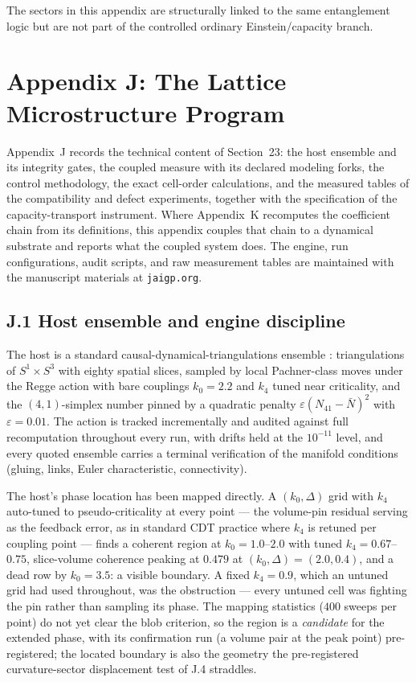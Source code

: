 \documentclass[11pt]{article}
\begin{document}
The sectors in this appendix are structurally linked to the same entanglement logic but are not part of the controlled ordinary Einstein/capacity branch.

\section*{Appendix J: The Lattice Microstructure Program}

Appendix~J records the technical content of Section~23: the host ensemble and its integrity gates, the coupled measure with its declared modeling forks, the control methodology, the exact cell-order calculations, and the measured tables of the compatibility and defect experiments, together with the specification of the capacity-transport instrument. Where Appendix~K recomputes the coefficient chain from its definitions, this appendix couples that chain to a dynamical substrate and reports what the coupled system does. The engine, run configurations, audit scripts, and raw measurement tables are maintained with the manuscript materials at \texttt{jaigp.org}.

\subsection*{J.1 Host ensemble and engine discipline}

The host is a standard causal-dynamical-triangulations ensemble \citep{AmbjornJurkiewiczLoll2004,AmbjornGJL2012}: triangulations of $S^1\times S^3$ with eighty spatial slices, sampled by local Pachner-class moves under the Regge action with bare couplings $k_0=2.2$ and $k_4$ tuned near criticality, and the $(4,1)$-simplex number pinned by a quadratic penalty $\varepsilon(N_{41}-\bar N)^2$ with $\varepsilon=0.01$. The action is tracked incrementally and audited against full recomputation throughout every run, with drifts held at the $10^{-11}$ level, and every quoted ensemble carries a terminal verification of the manifold conditions (gluing, links, Euler characteristic, connectivity).

The host's phase location has been mapped directly. A $(k_0,\Delta)$ grid with $k_4$ auto-tuned to pseudo-criticality at every point --- the volume-pin residual serving as the feedback error, as in standard CDT practice where $k_4$ is retuned per coupling point --- finds a coherent region at $k_0=1.0$--$2.0$ with tuned $k_4=0.67$--$0.75$, slice-volume coherence peaking at $0.479$ at $(k_0,\Delta)=(2.0,0.4)$, and a dead row by $k_0=3.5$: a visible boundary. A fixed $k_4=0.9$, which an untuned grid had used throughout, was the obstruction --- every untuned cell was fighting the pin rather than sampling its phase. The mapping statistics ($400$ sweeps per point) do not yet clear the blob criterion, so the region is a \emph{candidate} for the extended phase, with its confirmation run (a volume pair at the peak point) pre-registered; the located boundary is also the geometry the pre-registered curvature-sector displacement test of J.4 straddles.
\end{document}
